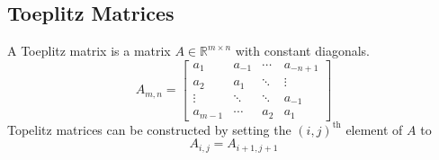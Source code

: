 \subsection{Toeplitz Matrices}
A Toeplitz matrix is a matrix $A\in\mathbb{R}^{m\times n}$ with constant diagonals. 
\begin{equation*}
A_{m,n} = \begin{bmatrix}
a_1 & a_{-1} & \cdots & a_{-n+1}\\
a_2 & a_1 & \ddots & \vdots\\
\vdots & \ddots & \ddots & a_{-1}\\
a_{m-1} & \cdots & a_2 & a_1
\end{bmatrix}
\end{equation*}
Topelitz matrices can be constructed by setting the $(i,j)^{\mbox{th}}$ element of $A$ to
\begin{equation*}
A_{i,j} = A_{i+1, j+1}
\end{equation*}
